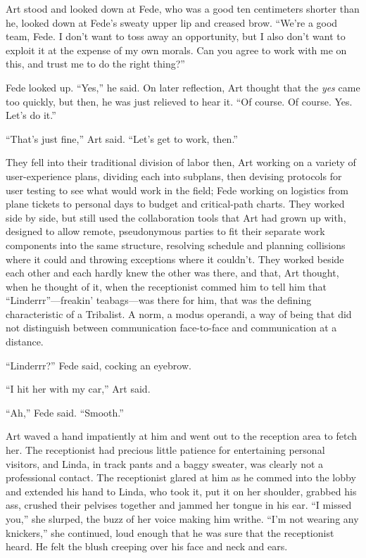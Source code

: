Art stood and looked down at Fede, who was a good ten centimeters
shorter than he, looked down at Fede’s sweaty upper lip and creased
brow. “We’re a good team, Fede. I don’t want to toss away an
opportunity, but I also don’t want to exploit it at the expense of
my own morals. Can you agree to work with me on this, and trust me
to do the right thing?”

Fede looked up. “Yes,” he said. On later reflection, Art thought
that the \emph{yes} came too quickly, but then, he was just
relieved to hear it. “Of course. Of course. Yes. Let’s do it.”

“That’s just fine,” Art said. “Let’s get to work, then.”

They fell into their traditional division of labor then, Art
working on a variety of user-experience plans, dividing each into
subplans, then devising protocols for user testing to see what
would work in the field; Fede working on logistics from plane
tickets to personal days to budget and critical-path charts. They
worked side by side, but still used the collaboration tools that
Art had grown up with, designed to allow remote, pseudonymous
parties to fit their separate work components into the same
structure, resolving schedule and planning collisions where it
could and throwing exceptions where it couldn’t. They worked beside
each other and each hardly knew the other was there, and that, Art
thought, when he thought of it, when the receptionist commed him to
tell him that “Linderrr”—freakin’ teabags—was there for him, that
was the defining characteristic of a Tribalist. A norm, a modus
operandi, a way of being that did not distinguish between
communication face-to-face and communication at a distance.

“Linderrr?” Fede said, cocking an eyebrow.

“I hit her with my car,” Art said.

“Ah,” Fede said. “Smooth.”

Art waved a hand impatiently at him and went out to the reception
area to fetch her. The receptionist had precious little patience
for entertaining personal visitors, and Linda, in track pants and a
baggy sweater, was clearly not a professional contact. The
receptionist glared at him as he commed into the lobby and extended
his hand to Linda, who took it, put it on her shoulder, grabbed his
ass, crushed their pelvises together and jammed her tongue in his
ear. “I missed you,” she slurped, the buzz of her voice making him
writhe. “I’m not wearing any knickers,” she continued, loud enough
that he was sure that the receptionist heard. He felt the blush
creeping over his face and neck and ears.

